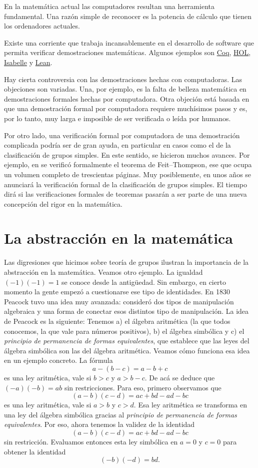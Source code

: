 En la matemática actual las computadores resultan una herramienta fundamental. Una razón 
simple de reconocer es la potencia de cálculo que tienen los ordenadores actuales. 

Existe una corriente que trabaja incansablemente en el desarrollo de software  
que permita verificar demostraciones matemáticas. Algunos ejemplos son 
\href{https://coq.inria.fr/}{Coq}, \href{https://hol-theorem-prover.org/}{HOL}, 
\href{https://isabelle.in.tum.de/}{Isabelle} 
y \href{https://leanprover.github.io/}{Lean}. 

Hay cierta controversia con las demostraciones hechas con computadoras. Las objeciones
son variadas. Una, por ejemplo, es la 
falta de belleza matemática en demostraciones formales hechas por computadora. Otra
objeción está basada en que una demostración formal por computadora requiere muchísimos pasos
y es, por lo tanto, muy larga e imposible de ser verificada o leída por humanos. 

Por otro lado, una verificación formal por computadora de una demostración complicada
podría ser de gran ayuda, en particular en casos como el de la clasificación de grupos
simples. En este sentido, se hicieron muchos avances. Por ejemplo, 
en se verificó formalmente el teorema de Feit--Thompson, ese que ocupa un volumen
completo de trescientas páginas. Muy posiblemente, en unos años 
se anunciará la verificación formal de la clasificación de grupos simples. El tiempo 
dirá si las verificaciones formales de teoremas pasarán a ser parte de una nueva concepción
del rigor en la matemática. 

\section*{La abstracción en la matemática}

Las digresiones que hicimos sobre teoría de grupos ilustran la importancia de la abstracción en la matemática. Veamos otro ejemplo. La igualdad $(-1)(-1)=1$ se conoce
desde la antigüedad. Sin embargo, en cierto momento la gente empezó a cuestionarse
ese tipo de identidades. En 1830 Peacock tuvo una idea muy avanzada: consideró dos tipos de manipulación algebraica y una forma de conectar esos distintos tipo de manipulación. La idea de Peacock es la siguiente: Tenemos a) el álgebra aritmética (la que todos conocemos, la que vale para números positivos), b) el álgebra simbólica y c) el \emph{principio de permanencia de formas equivalentes}, que establece que las leyes del álgebra simbólica son las del álgebra aritmética.  Veamos cómo funciona esa idea en un ejemplo concreto. La fórmula
\[
a-(b-c)=a-b+c
\]
es una ley aritmética, vale si $b>c$ y $a>b-c$. De acá se deduce que
$(-a)(-b)=ab$ sin restricciones. Para eso, 
primero observamos que 
\[
(a-b)(c-d)=ac+bd-ad-bc
\]
es una ley aritmética, vale si $a>b$ y $c>d$. Esa ley aritmética
se transforma en una ley del álgebra simbólica gracias al 
\emph{principio de permanencia de formas equivalentes}. Por eso, 
ahora tenemos la validez de la identidad 
\[
(a-b)(c-d)=ac+bd-ad-bc
\]
sin restricción. Evaluamos entonces esta ley simbólica en $a=0$ y $c=0$ 
para obtener la identidad
\[
(-b)(-d)=bd.
\]

